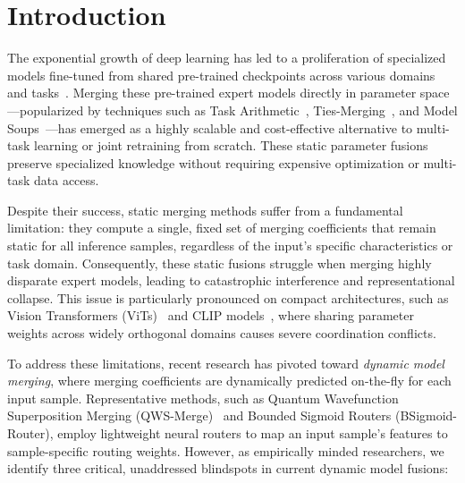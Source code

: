 \section{Introduction}
\label{sec:intro}

The exponential growth of deep learning has led to a proliferation of specialized models fine-tuned from shared pre-trained checkpoints across various domains and tasks~\cite{touvron2023llama}. Merging these pre-trained expert models directly in parameter space—popularized by techniques such as Task Arithmetic~\cite{ilharco2022editing}, Ties-Merging~\cite{yadav2023ties}, and Model Soups~\cite{wortsman2022model}—has emerged as a highly scalable and cost-effective alternative to multi-task learning or joint retraining from scratch. These static parameter fusions preserve specialized knowledge without requiring expensive optimization or multi-task data access.

Despite their success, static merging methods suffer from a fundamental limitation: they compute a single, fixed set of merging coefficients that remain static for all inference samples, regardless of the input's specific characteristics or task domain. Consequently, these static fusions struggle when merging highly disparate expert models, leading to catastrophic interference and representational collapse. This issue is particularly pronounced on compact architectures, such as Vision Transformers (ViTs)~\cite{dosovitskiy2020vit} and CLIP models~\cite{radford2021learning}, where sharing parameter weights across widely orthogonal domains causes severe coordination conflicts.

To address these limitations, recent research has pivoted toward \emph{dynamic model merging}, where merging coefficients are dynamically predicted on-the-fly for each input sample. Representative methods, such as Quantum Wavefunction Superposition Merging (QWS-Merge)~\cite{qwsmerge} and Bounded Sigmoid Routers (BSigmoid-Router), employ lightweight neural routers to map an input sample's features to sample-specific routing weights. However, as empirically minded researchers, we identify three critical, unaddressed blindspots in current dynamic model fusions:

